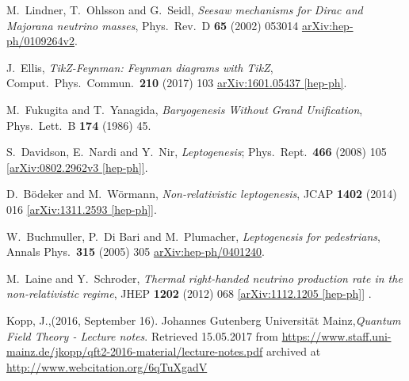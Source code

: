 \begin{thebibliography}{56}
M.~Lindner, T.~Ohlsson and G.~Seidl,
\textit{Seesaw mechanisms for Dirac and Majorana neutrino masses},
Phys.\ Rev.\ D {\textbf{ 65}} (2002) 053014
\href{https://arxiv.org/abs/hep-ph/0109264v2}{arXiv:hep-ph/0109264v2}.

J.~Ellis,
\textit{TikZ-Feynman: Feynman diagrams with TikZ},
Comput.\ Phys.\ Commun.\  {\textbf {210}} (2017) 103
\href{https://arxiv.org/abs/1601.05437}{arXiv:1601.05437 [hep-ph]}.

M.~Fukugita and T.~Yanagida,
\textit{Baryogenesis Without Grand Unification},
Phys.\ Lett.\ B {\textbf{174}} (1986) 45.

S.~Davidson, E.~Nardi and Y.~Nir,
\textit{Leptogenesis};
Phys.\ Rept.\  {\textbf{466}} (2008) 105
\href{https://arxiv.org/abs/0802.2962v3}{[arXiv:0802.2962v3 [hep-ph]]}.

D.~Bödeker and M.~Wörmann,
\textit{Non-relativistic leptogenesis},
JCAP {\textbf{1402}} (2014) 016
\href{https://arxiv.org/abs/1311.2593}{[arXiv:1311.2593 [hep-ph]]}.

W.~Buchmuller, P.~Di Bari and M.~Plumacher,
\textit{Leptogenesis for pedestrians},
Annals Phys.\  {\textbf{315}} (2005) 305
\href{https://arxiv.org/abs/hep-ph/0401240v1}{arXiv:hep-ph/0401240}.

M.~Laine and Y.~Schroder,
\textit{Thermal right-handed neutrino production rate in the non-relativistic regime},
JHEP {\textbf{1202}} (2012) 068
\href{https://arxiv.org/abs/1112.1205v2}{[arXiv:1112.1205 [hep-ph]]}
.

Kopp, J.,(2016, September 16). Johannes Gutenberg Universität Mainz,\textit{Quantum Field Theory - Lecture notes}.  Retrieved
15.05.2017 from \href{https://www.staff.uni-mainz.de/jkopp/qft2-2016-material/lecture-notes.pdf}{https://www.staff.uni-mainz.de/jkopp/qft2-2016-material/lecture-notes.pdf} archived at
\href{http://www.webcitation.org/6qTuXgadV}{http://www.webcitation.org/6qTuXgadV}


\end{thebibliography}

